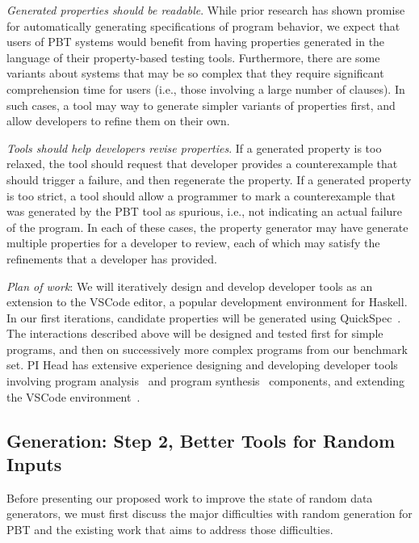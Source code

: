 \textit{Generated properties should be \emph{readable}}. While prior research
has shown promise for automatically generating specifications of program
behavior, we expect that users of PBT systems would benefit from having
properties generated in the language of their property-based testing tools.
Furthermore, there are some variants about systems that may be so complex that
they require significant comprehension time for users (i.e., those involving a
large number of clauses). In such cases, a tool may way to generate simpler
variants of properties first, and allow developers to refine them on their own.

\textit{Tools should help developers \emph{revise} properties}. If a generated
property is too relaxed, the tool should request that developer provides a
counterexample that should trigger a failure, and then regenerate the property.
If a generated property is too strict, a tool should allow a programmer to mark
a counterexample that was generated by the PBT tool as spurious, i.e., not
indicating an actual failure of the program. In each of these cases, the
property generator may have generate multiple properties for a developer to
review, each of which may satisfy the refinements that a developer has provided.

\textit{Plan of work}: We will iteratively design and develop developer tools as
an extension to the VSCode editor, a popular development environment for
Haskell. In our first iterations, candidate properties will be generated using
QuickSpec~\cite{claessen2010quickspec}. The interactions described above will be
designed and tested first for simple programs, and then on successively more
complex programs from our benchmark set. PI Head has extensive experience
designing and developing developer tools involving program
analysis~\cite{head2018interactive,head2019managing} and program
synthesis~\cite{head2017writing} components, and extending the VSCode
environment~\cite{head2020composing}.   

\subsection{Generation: Step 2, Better Tools for Random Inputs }

%
Before presenting our proposed work to improve the state of random data
generators, we must first discuss the major difficulties with random generation
for PBT and the existing work that aims to address those difficulties.

